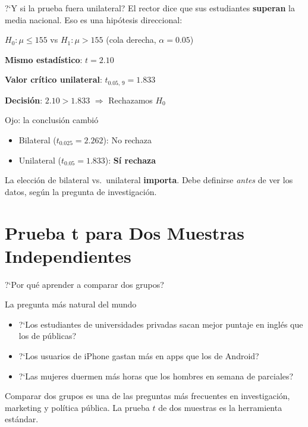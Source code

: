 \documentclass[aspectratio=169, 11pt]{beamer}
\begin{document}
\begin{frame}{?`Y si la prueba fuera unilateral?}
\small
El rector dice que sus estudiantes \textbf{superan} la media nacional. Eso es una hip\'otesis direccional:

$H_0: \mu \leq 155$ \quad vs \quad $H_1: \mu > 155$ (cola derecha, $\alpha = 0.05$)

\vspace{0.2cm}
\textbf{Mismo estad\'istico}: $t = 2.10$

\textbf{Valor cr\'itico unilateral}: $t_{0.05,\,9} = 1.833$

\textbf{Decisi\'on}: $2.10 > 1.833$ $\Rightarrow$ \alert{Rechazamos $H_0$}

\vspace{0.3cm}
\begin{alertblock}{Ojo: la conclusi\'on cambi\'o}
\begin{itemize}
  \item Bilateral ($t_{0.025} = 2.262$): No rechaza
  \item Unilateral ($t_{0.05} = 1.833$): \textbf{S\'i rechaza}
\end{itemize}
La elecci\'on de bilateral vs.\ unilateral \textbf{importa}. Debe definirse \emph{antes} de ver los datos, seg\'un la pregunta de investigaci\'on.
\end{alertblock}
\end{frame}

\section{Prueba t para Dos Muestras Independientes}

\begin{frame}{?`Por qu\'e aprender a comparar dos grupos?}
\small
\begin{exampleblock}{La pregunta m\'as natural del mundo}
\begin{itemize}\setlength{\itemsep}{2pt}
  \item ?`Los estudiantes de universidades privadas sacan mejor puntaje en ingl\'es que los de p\'ublicas?
  \item ?`Los usuarios de iPhone gastan m\'as en apps que los de Android?
  \item ?`Las mujeres duermen m\'as horas que los hombres en semana de parciales?
\end{itemize}
\end{exampleblock}

\vspace{0.2cm}
Comparar dos grupos es una de las preguntas m\'as frecuentes en investigaci\'on, marketing y pol\'itica p\'ublica. La prueba $t$ de dos muestras es la herramienta est\'andar.
\end{frame}
\end{document}
